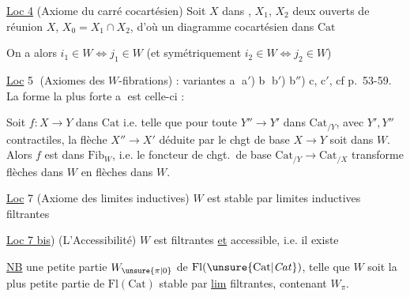 
\uline{Loc 4} (Axiome du carré cocartésien) Soit $X$ dans , $X_1$, $X_2$ deux ouverts de réunion $X$, $X_0=X_1\cap X_2$, d'où un diagramme cocartésien dans $\mathrm{Cat}$


On a alors $i_1\in W\iff j_1\in W$ (et symétriquement $i_2\in W\iff j_2\in W$)


\uline{Loc} \textcircled{5} (Axiomes des $W$-fibrations) :   variantes \textcircled{a} a$'$) \textcircled{b} b$'$) b$''$) c, c$'$, cf \uline{} p.~53-59. La forme la plus forte \textcircled{a} est celle-ci :

Soit $f:X\longrightarrow Y$ dans $\mathrm{Cat}$    i.e. telle que pour toute $Y''\to Y'$ dans $\mathrm{Cat}_{/Y}$, avec $Y',Y''$ contractiles,  la flèche $X''\to X'$ déduite par le chgt de base $X\to Y$ soit dans $W$. Alors $f$ est dans $\mathrm{Fib}_W$, i.e. le foncteur de chgt.\ de base  $\mathrm{Cat}_{/Y}\to\mathrm{Cat}_{/X}$ transforme flèches dans $W$ en flèches dans $W$.



\uline{Loc} 7 (Axiome des limites inductives) $W$ est stable par limites inductives filtrantes


\uline{Loc 7 bis}) (L'Accessibilité) $W$ est  filtrantes \uline{et} accessible, i.e. il existe


\uline{NB}  une petite partie  $W_{\unsure{\pi|0}}$ de $\mathrm{Fl}(\unsure{\mathrm{Cat}|\mathit{Cat}})$, telle que $W$ soit la plus petite partie de $\mathrm{Fl}(\mathrm{Cat})$ stable par \uline{lim} filtrantes, contenant $W_\pi$.
